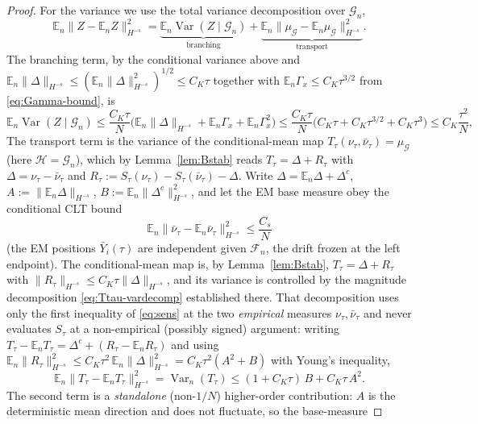 \documentclass[a4paper,fleqn]{cas-sc}
\theoremstyle{definition}
\theoremstyle{remark}
\begin{document}
\begin{proof}
For the variance we use the total variance decomposition over $\mathcal G_n$,
\[
\mathbb E_n\|Z-\mathbb E_nZ\|_{H^{-s}}^2
=\underbrace{\mathbb E_n\operatorname{Var}(Z\mid\mathcal G_n)}_{\text{branching}}
+\underbrace{\mathbb E_n\|\mu_{\mathcal G}-\mathbb E_n\mu_{\mathcal G}\|_{H^{-s}}^2}_{\text{transport}}.
\]
The branching term, by the conditional variance above and
$\mathbb E_n\|\Delta\|_{H^{-s}}\le(\mathbb E_n\|\Delta\|_{H^{-s}}^2)^{1/2}
\le C_K\tau$ together with $\mathbb E_n\Gamma_x\le C_K\tau^{3/2}$ from
\eqref{eq:Gamma-bound}, is
\[
\mathbb E_n\operatorname{Var}(Z\mid\mathcal G_n)
\le\frac{C_K\tau}{N}\bigl(\mathbb E_n\|\Delta\|_{H^{-s}}+\mathbb E_n\Gamma_x+\mathbb E_n\Gamma_x^2\bigr)
\le\frac{C_K\tau}{N}\bigl(C_K\tau+C_K\tau^{3/2}+C_K\tau^3\bigr)\le C_K\frac{\tau^2}{N},
\]
The transport term is the variance of the conditional-mean map
$T_\tau(\nu_\tau,\bar\nu_\tau)=\mu_{\mathcal G}$ (here $\mathcal H=\mathcal G_n$),
which by Lemma~\ref{lem:Bstab} reads $T_\tau=\Delta+R_\tau$ with $\Delta=\nu_\tau-\bar\nu_\tau$
and $R_\tau:=S_\tau(\nu_\tau)-S_\tau(\bar\nu_\tau)-\Delta$. Write
$\Delta=\mathbb E_n\Delta+\Delta^c$, $A:=\|\mathbb E_n\Delta\|_{H^{-s}}$,
$B:=\mathbb E_n\|\Delta^c\|_{H^{-s}}^2$, and let the EM base measure obey the conditional
CLT bound
\begin{equation}\label{eq:base-clt}
\mathbb E_n\|\bar\nu_\tau-\mathbb E_n\bar\nu_\tau\|_{H^{-s}}^2\le\frac{C_s}{N}
\end{equation}
(the EM positions $\bar Y_i(\tau)$ are independent given $\mathcal F_n$, the drift
frozen at the left endpoint). The conditional-mean map is, by Lemma~\ref{lem:Bstab},
$T_\tau=\Delta+R_\tau$ with $\|R_\tau\|_{H^{-s}}\le C_K\tau\|\Delta\|_{H^{-s}}$, and its
variance is controlled by the magnitude decomposition \eqref{eq:Ttau-vardecomp}
established there. That decomposition uses only the first inequality of \eqref{eq:sens}
at the two \emph{empirical} measures $\nu_\tau,\bar\nu_\tau$ and never evaluates
$S_\tau$ at a non-empirical (possibly signed) argument: writing
$T_\tau-\mathbb E_nT_\tau=\Delta^c+(R_\tau-\mathbb E_nR_\tau)$ and using
$\mathbb E_n\|R_\tau\|_{H^{-s}}^2\le C_K\tau^2\,\mathbb E_n\|\Delta\|_{H^{-s}}^2
=C_K\tau^2(A^2+B)$ with Young's inequality,
\begin{equation}\label{eq:Ttau-var}
\mathbb E_n\bigl\|T_\tau-\mathbb E_nT_\tau\bigr\|_{H^{-s}}^2
=\operatorname{Var}_n(T_\tau)\le(1+C_K\tau)\,B+C_K\tau\,A^2 .
\end{equation}
The second term is a \emph{standalone} (non-$1/N$) higher-order contribution: $A$ is
the deterministic mean direction and does not fluctuate, so the base-measure

\end{proof}
\end{document}
